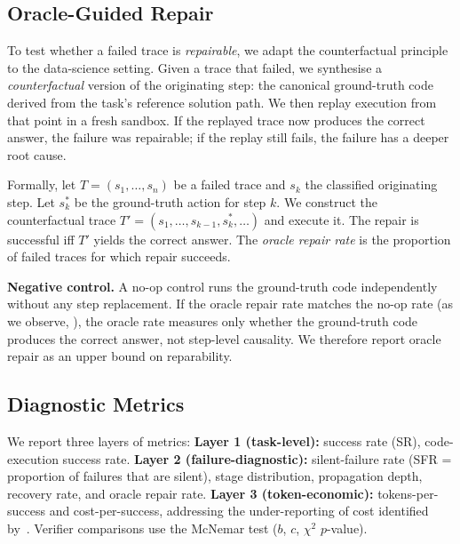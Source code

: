 \subsection{Oracle-Guided Repair}
\label{sec:causal}

To test whether a failed trace is \emph{repairable}, we adapt the counterfactual principle~\citep{shah2026causal} to the data-science setting. Given a trace that failed, we synthesise a \emph{counterfactual} version of the originating step: the canonical ground-truth code derived from the task's reference solution path. We then replay execution from that point in a fresh sandbox. If the replayed trace now produces the correct answer, the failure was repairable; if the replay still fails, the failure has a deeper root cause.

Formally, let $T = (s_1, \dots, s_n)$ be a failed trace and $s_k$ the classified originating step. Let $s_k^*$ be the ground-truth action for step $k$. We construct the counterfactual trace $T' = (s_1, \dots, s_{k-1}, s_k^*, \dots)$ and execute it. The repair is successful iff $T'$ yields the correct answer. The \emph{oracle repair rate} is the proportion of failed traces for which repair succeeds.

\textbf{Negative control.} A no-op control runs the ground-truth code independently without any step replacement. If the oracle repair rate matches the no-op rate (as we observe, ), the oracle rate measures only whether the ground-truth code produces the correct answer, not step-level causality. We therefore report oracle repair as an upper bound on reparability.

\subsection{Diagnostic Metrics}
\label{sec:metrics}

We report three layers of metrics: \textbf{Layer 1 (task-level):} success rate (SR), code-execution success rate. \textbf{Layer 2 (failure-diagnostic):} silent-failure rate (SFR = proportion of failures that are silent), stage distribution, propagation depth, recovery rate, and oracle repair rate. \textbf{Layer 3 (token-economic):} tokens-per-success and cost-per-success, addressing the under-reporting of cost identified by~\citet{moghadasi2026what}. Verifier comparisons use the McNemar test ($b$, $c$, $\chi^2$ $p$-value).
